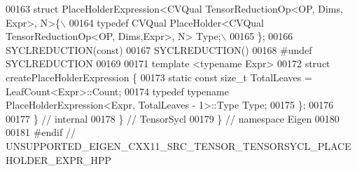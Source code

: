 \begin{DoxyCode}
00163 \textcolor{preprocessor}{struct PlaceHolderExpression<CVQual TensorReductionOp<OP, Dims, Expr>, N>\{\(\backslash\)}
00164 \textcolor{preprocessor}{  typedef CVQual PlaceHolder<CVQual TensorReductionOp<OP, Dims,Expr>, N> Type;\(\backslash\)}
00165 \textcolor{preprocessor}{\};}
00166 SYCLREDUCTION(\textcolor{keyword}{const})
00167 SYCLREDUCTION()
00168 \textcolor{preprocessor}{#undef SYCLREDUCTION}
00169 
00171 \textcolor{keyword}{template} <\textcolor{keyword}{typename} Expr>
00172 \textcolor{keyword}{struct }createPlaceHolderExpression \{
00173   \textcolor{keyword}{static} \textcolor{keyword}{const} \textcolor{keywordtype}{size\_t} TotalLeaves = LeafCount<Expr>::Count;
00174   \textcolor{keyword}{typedef} \textcolor{keyword}{typename} PlaceHolderExpression<Expr, TotalLeaves - 1>::Type Type;
00175 \};
00176 
00177 \}  \textcolor{comment}{// internal}
00178 \}  \textcolor{comment}{// TensorSycl}
00179 \}  \textcolor{comment}{// namespace Eigen}
00180 
00181 \textcolor{preprocessor}{#endif  // UNSUPPORTED\_EIGEN\_CXX11\_SRC\_TENSOR\_TENSORSYCL\_PLACEHOLDER\_EXPR\_HPP}
\end{DoxyCode}
